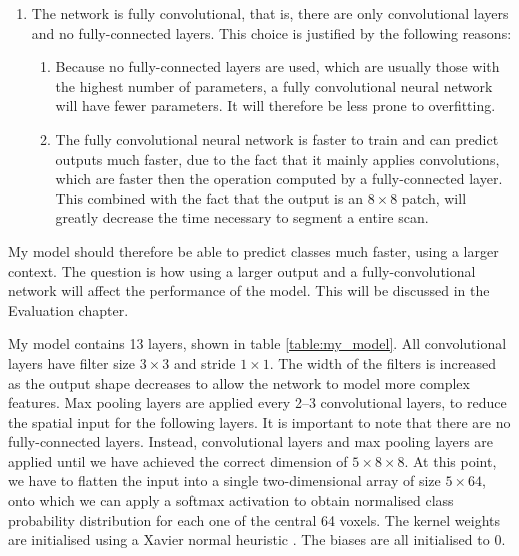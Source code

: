 \documentclass[12pt,a4paper,twoside,openright]{report}
\begin{document}
\begin{enumerate}
	\item The network is fully convolutional, that is, there are only convolutional layers and no fully-connected layers. This choice is justified by the following reasons:
	\begin{enumerate}
		\item Because no fully-connected layers are used, which are usually those with the highest number of parameters, a fully convolutional neural network will have fewer parameters. It will therefore be less prone to overfitting.
		\item The fully convolutional neural network is faster to train and can predict outputs much faster, due to the fact that it mainly applies convolutions, which are faster then the operation computed by a fully-connected layer. This combined with the fact that the output is an $8 \times 8$ patch, will greatly decrease the time necessary to segment a entire scan.
	\end{enumerate}
\end{enumerate}

My model should therefore be able to predict classes much faster, using a larger context. The question is how using a larger output and a fully-convolutional network will affect the performance of the model. This will be discussed in the Evaluation chapter.

My model contains 13 layers, shown in table \ref{table:my_model}. All convolutional layers have filter size $3 \times 3$ and stride $1 \times 1$. The width of the filters is increased as the output shape decreases to allow the network to model more complex features. Max pooling layers are applied every 2--3 convolutional layers, to reduce the spatial input for the following layers. It is important to note that there are no fully-connected layers. Instead, convolutional layers and max pooling layers are applied until we have achieved the correct dimension of $5 \times 8 \times 8$. At this point, we have to flatten the input into a single two-dimensional array of size $5 \times 64$, onto which we can apply a softmax activation to obtain normalised class probability distribution for each one of the central 64 voxels. The kernel weights are initialised using a Xavier normal heuristic \cite{xavier_init}. The biases are all initialised to 0.
\end{document}
